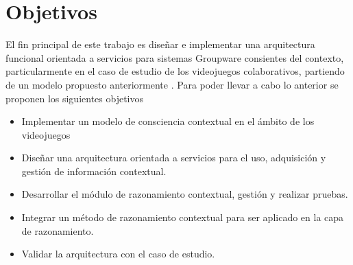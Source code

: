 \section{Objetivos}
El fin principal de este trabajo es dise\~nar e implementar una arquitectura funcional orientada a servicios para sistemas Groupware consientes del contexto, particularmente en el caso de estudio de los videojuegos colaborativos, partiendo de un modelo propuesto anteriormente \cite{montane2013context}. Para poder llevar a cabo lo anterior se proponen los siguientes objetivos
\begin{itemize}
\item Implementar un modelo de consciencia contextual en el \'ambito de los videojuegos
\item Dise\~nar una arquitectura orientada a servicios para el uso, adquisici\'on y gesti\'on de informaci\'on contextual.
\item Desarrollar el m\'odulo de razonamiento contextual,  gesti\'on y realizar pruebas.
\item Integrar un m\'etodo de razonamiento contextual para ser aplicado en la capa de razonamiento.
\item Validar la arquitectura con el caso de estudio.
\end{itemize}